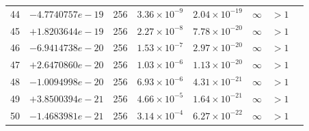 \documentclass[11pt]{article}
\begin{document}
\begin{longtable}{rlcccccc}
44 & $-4.7740757e-19$ & 256 & $3.36 \times 10^{-9}$ & $2.04 \times 10^{-19}$ & $\infty$ & $> 1$ \\
45 & $+1.8203644e-19$ & 256 & $2.27 \times 10^{-8}$ & $7.78 \times 10^{-20}$ & $\infty$ & $> 1$ \\
46 & $-6.9414738e-20$ & 256 & $1.53 \times 10^{-7}$ & $2.97 \times 10^{-20}$ & $\infty$ & $> 1$ \\
47 & $+2.6470860e-20$ & 256 & $1.03 \times 10^{-6}$ & $1.13 \times 10^{-20}$ & $\infty$ & $> 1$ \\
48 & $-1.0094998e-20$ & 256 & $6.93 \times 10^{-6}$ & $4.31 \times 10^{-21}$ & $\infty$ & $> 1$ \\
49 & $+3.8500394e-21$ & 256 & $4.66 \times 10^{-5}$ & $1.64 \times 10^{-21}$ & $\infty$ & $> 1$ \\
50 & $-1.4683981e-21$ & 256 & $3.14 \times 10^{-4}$ & $6.27 \times 10^{-22}$ & $\infty$ & $> 1$ \\
\bottomrule
\end{longtable}
\end{document}

